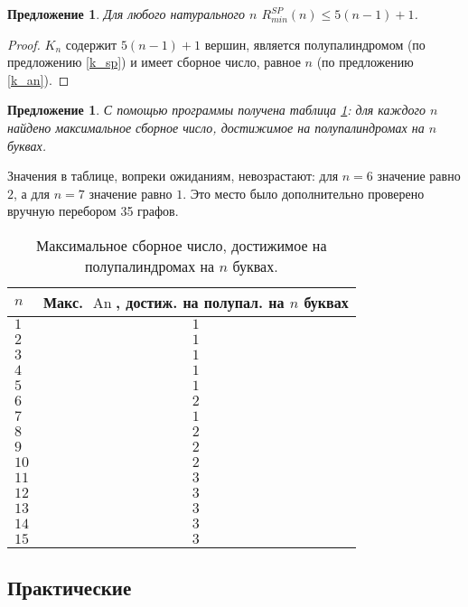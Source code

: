 \documentclass[a4paper,fleqn,12pt,top=0pt]{article}
\theoremstyle{plain}
\newtheorem{proposition}[theorem]{Предложение}
\theoremstyle{definition}
\theoremstyle{remark}
\newcommand{\An}{\operatorname{An}}
\begin{document}
\begin{proposition}
    Для любого натурального $n$ $R_{min}^{SP}(n) \le 5(n-1) + 1$.
\end{proposition}
\begin{proof}
    $K_n$ содержит $5(n-1)+1$ вершин, является полупалиндромом (по предложению \ref{k_sp}) и имеет сборное число, равное $n$ (по предложению \ref{k_an}).
\end{proof}

\begin{proposition}
    С помощью программы\cite{github} получена таблица \ref{an}: для каждого $n$ найдено максимальное сборное число, достижимое на полупалиндромах на $n$ буквах.
\end{proposition}
Значения в таблице, вопреки ожиданиям, невозрастают: для $n = 6$ значение равно $2$, а для $n = 7$ значение равно $1$. Это место было дополнительно проверено вручную перебором 35 графов.


\begin{table}
    \centering
    \begin{tabular}{ |l|c| } 
     \hline
     $n$ & Макс. $\An$, достиж. на полупал. на $n$ буквах \\
     \hline
     $1$ & $1$ \\
     $2$ & $1$ \\
     $3$ & $1$ \\
     $4$ & $1$ \\
     $5$ & $1$ \\
     $6$ & $2$ \\
     $7$ & $1$ \\
     $8$ & $2$ \\
     $9$ & $2$ \\
     $10$ & $2$ \\
     $11$ & $3$ \\
     $12$ & $3$ \\
     $13$ & $3$ \\
     $14$ & $3$ \\
     $15$ & $3$ \\
     \hline
    \end{tabular}
    \caption{Максимальное сборное число, достижимое на полупалиндромах на $n$ буквах.}
    \label{an}
\end{table}

\newpage
\subsection{Практические}
\end{document}
